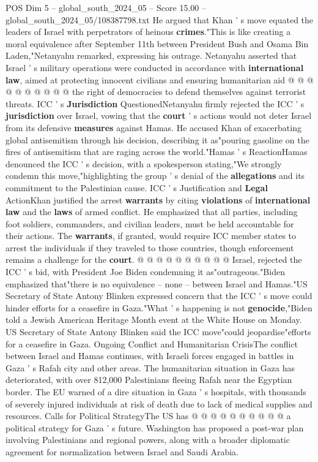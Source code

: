 \begin{textsample}{POS Dim 5 – global\_south\_2024\_05 – Score 15.00 – global\_south\_2024\_05/108387798.txt}
He argued that Khan ' s move equated the leaders of Israel with perpetrators of heinous \textbf{crimes}."This is like creating a moral equivalence after September 11th between President Bush and Osama Bin Laden,"Netanyahu remarked, expressing his outrage.
Netanyahu asserted that Israel ' s military operations were conducted in accordance with \textbf{international} \textbf{law}, aimed at protecting innocent civilians and ensuring humanitarian aid @ @ @ @ @ @ @ @ @ @ the right of democracies to defend themselves against terrorist threats.
ICC ' s \textbf{Jurisdiction} QuestionedNetanyahu firmly rejected the ICC ' s \textbf{jurisdiction} over Israel, vowing that the \textbf{court} ' s actions would not deter Israel from its defensive \textbf{measures} against Hamas.
He accused Khan of exacerbating global antisemitism through his decision, describing it as"pouring gasoline on the fires of antisemitism that are raging across the world."Hamas ' s ReactionHamas denounced the ICC ' s decision, with a spokesperson stating,"We strongly condemn this move,"highlighting the group ' s denial of the \textbf{allegations} and its commitment to the Palestinian cause.
ICC ' s Justification and \textbf{Legal} ActionKhan justified the arrest \textbf{warrants} by citing \textbf{violations} of \textbf{international} \textbf{law} and the \textbf{laws} of armed conflict.
He emphasized that all parties, including foot soldiers, commanders, and civilian leaders, must be held accountable for their actions.
The \textbf{warrants}, if granted, would require ICC member states to arrest the individuals if they traveled to those countries, though enforcement remains a challenge for the \textbf{court}. @ @ @ @ @ @ @ @ @ @ Israel, rejected the ICC ' s bid, with President Joe Biden condemning it as"outrageous."Biden emphasized that"there is no equivalence -- none -- between Israel and Hamas."US Secretary of State Antony Blinken expressed concern that the ICC ' s move could hinder efforts for a ceasefire in Gaza."What ' s happening is not \textbf{genocide},"Biden told a Jewish American Heritage Month event at the White House on Monday.
US Secretary of State Antony Blinken said the ICC move"could jeopardise"efforts for a ceasefire in Gaza.
Ongoing Conflict and Humanitarian CrisisThe conflict between Israel and Hamas continues, with Israeli forces engaged in battles in Gaza ' s Rafah city and other areas.
The humanitarian situation in Gaza has deteriorated, with over 812,000 Palestinians fleeing Rafah near the Egyptian border.
The EU warned of a dire situation in Gaza ' s hospitals, with thousands of severely injured individuals at risk of death due to lack of medical supplies and resources.
Calls for Political StrategyThe US has @ @ @ @ @ @ @ @ @ @ a political strategy for Gaza ' s future.
Washington has proposed a post-war plan involving Palestinians and regional powers, along with a broader diplomatic agreement for normalization between Israel and Saudi Arabia.

\end{textsample}
